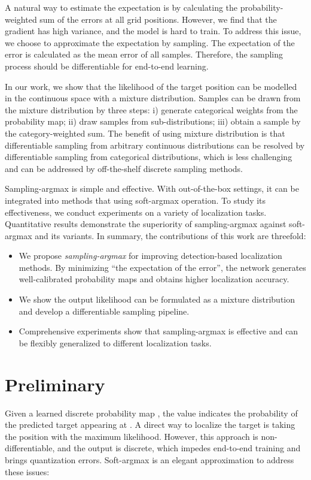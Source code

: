 \documentclass{article}
\begin{document}
A natural way to estimate the expectation is by calculating the probability-weighted sum of the errors at all grid positions. However, we find that the gradient has high variance, and the model is hard to train. To address this issue, we choose to approximate the expectation by sampling. The expectation of the error is calculated as the mean error of all samples. Therefore, the sampling process should be differentiable for end-to-end learning.

In our work, we show that the likelihood of the target position can be modelled in the continuous space with a mixture distribution. Samples can be drawn from the mixture distribution by three steps: i) generate categorical weights from the probability map; ii) draw samples from sub-distributions; iii) obtain a sample by the category-weighted sum.
The benefit of using mixture distribution is that differentiable sampling from arbitrary continuous distributions can be resolved by differentiable sampling from categorical distributions, which is less challenging and can be addressed by off-the-shelf discrete sampling methods.


Sampling-argmax is simple and effective. With out-of-the-box settings, it can be integrated into methods that using soft-argmax operation. To study its effectiveness, we conduct experiments on a variety of localization tasks. Quantitative results demonstrate the superiority of sampling-argmax against soft-argmax and its variants. In summary, the contributions of this work are threefold:
\begin{itemize}
    \item We propose \textit{sampling-argmax} for improving detection-based localization methods. By minimizing ``the expectation of the error'', the network generates well-calibrated probability maps and obtains higher localization accuracy.
    \item We show the output likelihood can be formulated as a mixture distribution and develop a differentiable sampling pipeline.
\item Comprehensive experiments show that sampling-argmax is effective and can be flexibly generalized to different localization tasks.
\end{itemize}
 
\section{Preliminary}
Given a learned discrete probability map , the value  indicates the probability of the predicted target appearing at . A direct way to localize the target is taking the position with the maximum likelihood. However, this approach is non-differentiable, and the output is discrete, which impedes end-to-end training and brings quantization errors. Soft-argmax is an elegant approximation to address these issues:
\end{document}
